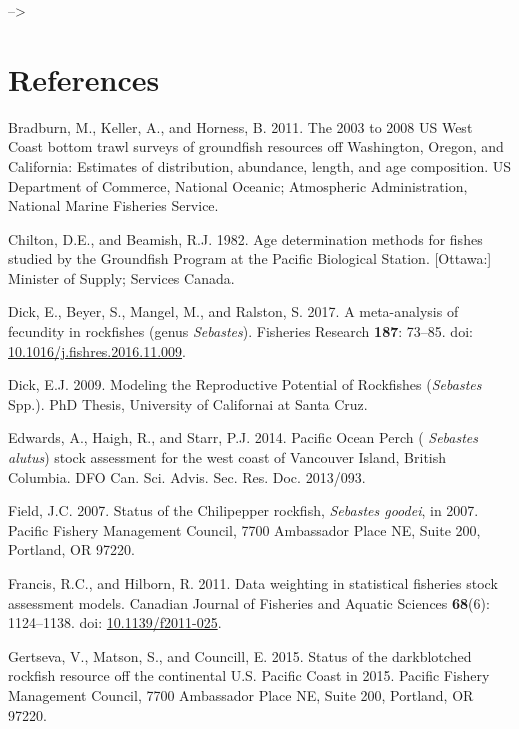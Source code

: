 \documentclass[12pt,]{article}
\begin{document}
\newpage

--\textgreater{} \color{black}

\section{References}\label{references}

\renewcommand{\thepage}{}

\hypertarget{refs}{}
\hypertarget{ref-bradburn_2003_2011}{}
Bradburn, M., Keller, A., and Horness, B. 2011. The 2003 to 2008 US West
Coast bottom trawl surveys of groundfish resources off Washington,
Oregon, and California: Estimates of distribution, abundance, length,
and age composition. US Department of Commerce, National Oceanic;
Atmospheric Administration, National Marine Fisheries Service.

\hypertarget{ref-chilton_age_1982}{}
Chilton, D.E., and Beamish, R.J. 1982. Age determination methods for
fishes studied by the Groundfish Program at the Pacific Biological
Station. {[}Ottawa:{]} Minister of Supply; Services Canada.

\hypertarget{ref-dick_meta-analysis_2017}{}
Dick, E., Beyer, S., Mangel, M., and Ralston, S. 2017. A meta-analysis
of fecundity in rockfishes (genus \emph{Sebastes}). Fisheries Research
\textbf{187}: 73--85. doi:
\href{https://doi.org/10.1016/j.fishres.2016.11.009}{10.1016/j.fishres.2016.11.009}.

\hypertarget{ref-dick_modeling_2009}{}
Dick, E.J. 2009. Modeling the Reproductive Potential of Rockfishes
(\emph{Sebastes} Spp.). PhD Thesis, University of Californai at Santa
Cruz.

\hypertarget{ref-edwards_pacific_2014}{}
Edwards, A., Haigh, R., and Starr, P.J. 2014. Pacific Ocean Perch (
\emph{Sebastes alutus}) stock assessment for the west coast of Vancouver
Island, British Columbia. DFO Can. Sci. Advis. Sec. Res. Doc. 2013/093.

\hypertarget{ref-field_status_2007}{}
Field, J.C. 2007. Status of the Chilipepper rockfish, \emph{Sebastes
goodei}, in 2007. Pacific Fishery Management Council, 7700 Ambassador
Place NE, Suite 200, Portland, OR 97220.

\hypertarget{ref-francis_data_2011}{}
Francis, R.C., and Hilborn, R. 2011. Data weighting in statistical
fisheries stock assessment models. Canadian Journal of Fisheries and
Aquatic Sciences \textbf{68}(6): 1124--1138. doi:
\href{https://doi.org/10.1139/f2011-025}{10.1139/f2011-025}.

\hypertarget{ref-gertseva_status_2015}{}
Gertseva, V., Matson, S., and Councill, E. 2015. Status of the
darkblotched rockfish resource off the continental U.S. Pacific Coast in
2015. Pacific Fishery Management Council, 7700 Ambassador Place NE,
Suite 200, Portland, OR 97220.
\end{document}
